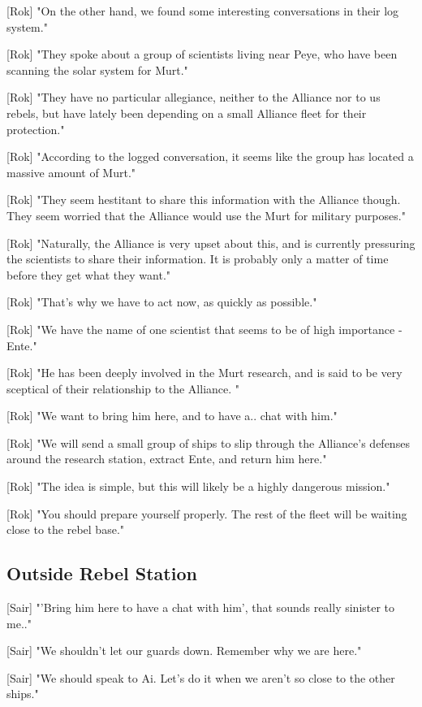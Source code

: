 \documentclass[a4paper,12pt]{article}
\begin{document}
[Rok] "On the other hand, we found some interesting conversations in their log system."

[Rok] "They spoke about a group of scientists living near Peye, who have been scanning the solar system for Murt."

[Rok] "They have no particular allegiance, neither to the Alliance nor to us rebels, but have lately been depending on a small
Alliance fleet for their protection."

[Rok] "According to the logged conversation, it seems like the group has located a massive amount of Murt."

[Rok] "They seem hestitant to share this information with the Alliance though. They seem worried that the Alliance
would use the Murt for military purposes."

[Rok] "Naturally, the Alliance is very upset about this, and is currently pressuring the scientists to share their information. It is
probably only a matter of time before they get what they want."

[Rok] "That's why we have to act now, as quickly as possible."

[Rok] "We have the name of one scientist that seems to be of high importance - Ente." 

[Rok] "He has been deeply involved in the Murt research, and is said to be very sceptical of their relationship to the Alliance. "

[Rok] "We want to bring him here, and to have a.. chat with him." 

[Rok] "We will send a small group of ships to slip through the Alliance's defenses around the research station, 
extract Ente, and return him here."

[Rok] "The idea is simple, but this will likely be a highly dangerous mission." 

[Rok] "You should prepare yourself properly. The rest of the fleet will be waiting close to the rebel base."

\subsection{Outside Rebel Station}

[Sair] "'Bring him here to have a chat with him', that sounds really sinister to me.." 

[Sair] "We shouldn't let our guards down. Remember why we are here." 

[Sair] "We should speak to Ai. Let's do it when we aren't so close to the other ships."
\end{document}
